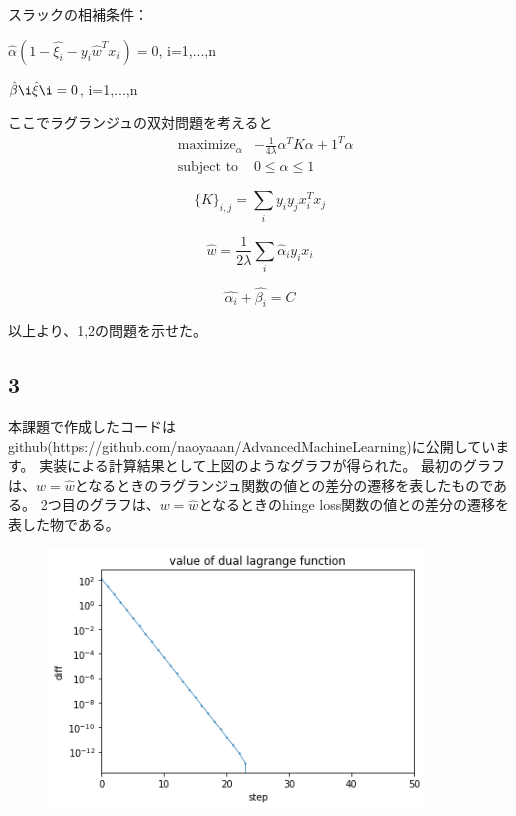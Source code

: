 \documentclass[a4j,11pt]{jarticle}
\begin{document}
スラックの相補条件：
\begin{center}
    $\hat{\alpha}(1-\hat{\xi_i}-y_i\hat{w}^Tx_i) = 0$, i=1,...,n

    $\hat{\beta}\i \hat{\xi}\i = 0$, i=1,...,n
\end{center}

ここでラグランジュの双対問題を考えると
\begin{equation}
    \begin{aligned}
        & \text{maximize}_{\alpha}
            & -\frac{1}{4\lambda}\alpha^TK\alpha+1^T\alpha\\
        &\text{subject to}
            & 0\leq\alpha\leq 1
    \end{aligned}
\end{equation}

\begin{equation*}
    \{K\}_{i,j} = \sum_i y_i y_j x_i^T x_j
\end{equation*}

\begin{equation*}
    \hat{w} = \frac{1}{2\lambda}\sum_i \hat{\alpha}_i y_i x_i
\end{equation*}

\begin{equation*}
    \hat{\alpha_i} + \hat{\beta_i} = C
\end{equation*}

以上より、1,2の問題を示せた。

\subsection*{3}
本課題で作成したコードはgithub(https://github.com/naoyaaan/AdvancedMachineLearning)に公開しています。
\newpage
実装による計算結果として上図のようなグラフが得られた。
最初のグラフは、$w=\hat{w}$となるときのラグランジュ関数の値との差分の遷移を表したものである。
2つ目のグラフは、$w=\hat{w}$となるときのhinge loss関数の値との差分の遷移を表した物である。

\begin{figure}
    \centering
    \includegraphics[width=10cm]{p3-3-1.png}
\end{figure}
\end{document}
